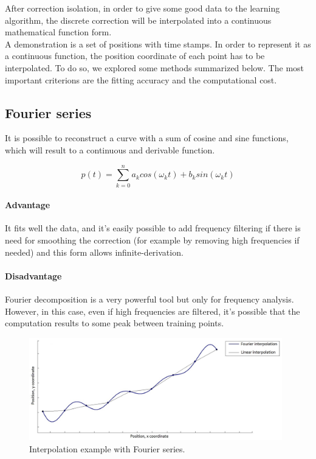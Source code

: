 After correction isolation, in order to give some good data to the learning algorithm, the discrete correction will be interpolated into a continuous mathematical function form.\\
A demonstration is a set of positions with time stamps. In order to represent it as a continuous function, the position coordinate of each point has to be interpolated. To do so, we explored some methods summarized below. The most important criterions are the fitting accuracy and the computational cost.\\

\subsection{Fourier series}

It is possible to reconstruct a curve with a sum of cosine and sine functions, which will result to a continuous and derivable function.

\begin{equation}
    p(t) = \sum_{k=0}^n a_k cos(\omega_k t) + b_k sin(\omega_k t)
    \label{equ_fourier}
\end{equation}

\paragraph*{Advantage}

It fits well the data, and it's easily possible to add frequency filtering if there is need for smoothing the correction (for example by removing high frequencies if needed) and this form allows infinite-derivation.

\paragraph*{Disadvantage}

Fourier decomposition is a very powerful tool but only for frequency analysis. However, in this case, even if high frequencies are filtered, it's possible that the computation results to some peak between training points.

\begin{figure}[H]
\centering
\includegraphics[width=11cm]{img/fourier.jpg}
\caption{Interpolation example with Fourier series.}
\label{fourier_fail}
\end{figure}

